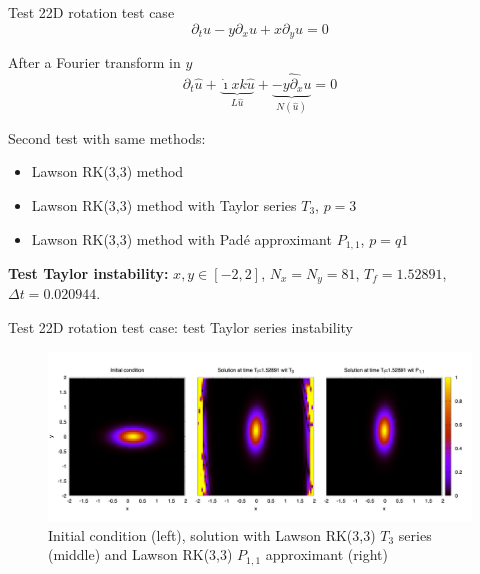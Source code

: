 \documentclass{beamer}
\newcommand{\mbold}[1]{{\textbf{\color{PLB}#1}}}
\newcommand{\I}{\dot{\imath}}
\begin{document}
\begin{frame}{Test 2}{2D rotation test case}
  $$\partial_t u - y\partial_x u + x\partial_y u = 0$$

  After a Fourier transform in $y$
  $$\partial_t \hat{u} + \underbrace{\I xk\hat{u}}_{L \hat{u}} + \underbrace{\widehat{-y\partial_x u}}_{N(\hat{u})} = 0$$

  Second test with same methods:
  \begin{itemize}
    \item Lawson RK(3,3) method
    \item Lawson RK(3,3) method with Taylor series $T_3$, $p=3$
    \item Lawson RK(3,3) method with Padé approximant $P_{1,1}$, $p=q1$
  \end{itemize}
  \mbold{Test Taylor instability:} $x,y\in[-2,2]$, $N_x=N_y=81$, $T_f=1.52891$, $\Delta t=0.020944$.
\end{frame}
\begin{frame}{Test 2}{2D rotation test case: test Taylor series instability}
  \begin{figure}
    \centering
    \includegraphics[width=\textwidth]{img/uf_t3p11}
    \caption{Initial condition (left), solution with Lawson RK(3,3) $T_3$ series (middle) and Lawson RK(3,3) $P_{1,1}$ approximant (right)}
  \end{figure}
\end{frame}


\newcommand{\gz}{\textcolor{gris!80}{0}}
\end{document}
